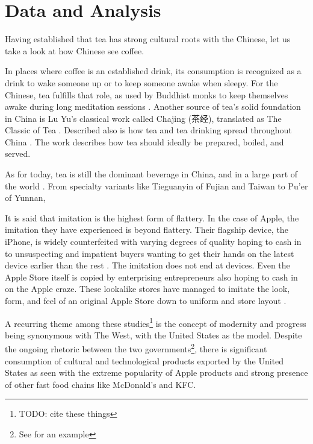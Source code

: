 \section{Data and Analysis}

Having established that tea has strong cultural roots with the Chinese, let us
take a look at how Chinese see coffee.

In places where coffee is an established drink, its consumption is recognized as
a drink to wake someone up or to keep someone awake when sleepy. For the
Chinese, tea fulfills that role, as used by Buddhist monks to keep themselves
awake during long meditation sessions \autocite[268]{kieschnick_impact_2003}.
Another source of tea's solid foundation in China is Lu Yu's classical work
called Chajing (茶经), translated as The Classic of Tea
\autocite{lu_classic_1974}.  Described also is how tea and tea drinking spread
throughout China \autocite[266-267]{kieschnick_impact_2003}. The work describes
how tea should ideally be prepared, boiled, and served.

As for today, tea is still the dominant beverage in China, and in a large part
of the world \autocite{that_euromon_stat_on_tea}. From specialty variants like
Tieguanyin of Fujian and Taiwan to Pu'er of Yunnan, 



It is said that imitation is the highest form of flattery. In the case of Apple,
the imitation they have experienced is beyond flattery. Their flagship device,
the iPhone, is widely counterfeited with varying degrees of quality hoping to
cash in to unsuspecting and impatient buyers wanting to get their hands on the
latest device earlier than the rest \autocite{justice_iphone_2015}. The imitation
does not end at devices. Even the Apple Store itself is copied by enterprising
entrepreneurs also hoping to cash in on the Apple craze. These lookalike stores
have managed to imitate the look, form, and feel of an original Apple Store down
to uniform and store layout \autocite{lee_chinas_2015}.


A recurring theme among these studies\footnote{TODO: cite these things} is the
concept of modernity and progress being synonymous with The West, with the
United States as the model. Despite the ongoing rhetoric between the two
governments\footnote{See \textcite{dizon_south_2016} for an example}, there is
significant consumption of cultural and technological products exported by the
United States as seen with the extreme popularity of Apple products and strong
presence of other fast food chains like McDonald's and KFC.

